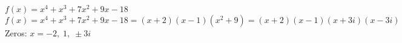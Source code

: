 {$f(x) = x^4+x^3+7x^2+9x-18$}
{$f(x) = x^4+x^3+7x^2+9x-18 = (x+2)(x-1)\left(x^2+9\right) = (x+2)(x-1)(x+3i)(x-3i)$\\
Zeros:  $x = -2, \; 1, \; \pm 3i$}
